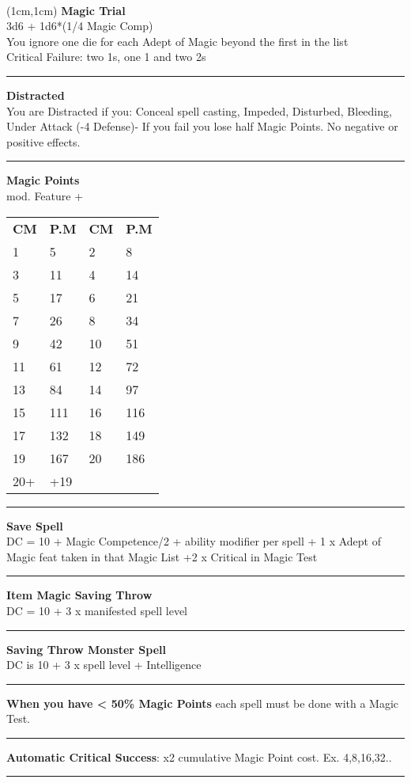 \documentclass[a4paper,12 pt,openany]{book}
\newcommand{\linex}{\rule{\textwidth}{0.4pt}}
\begin{document}
~\newpage

\begin{textblock*}{5cm}(1cm,1cm) %
\textbf{Magic Trial}\\
3d6 + 1d6*(1/4 Magic Comp)\\
You ignore one die for each Adept of Magic beyond the first in the list\\
Critical Failure: two 1s, one 1 and two 2s\\


\linex

\textbf{Distracted}\\
You are Distracted if you: Conceal spell casting, Impeded, Disturbed, Bleeding, Under Attack (-4 Defense)-
If you fail you lose half Magic Points. No negative or positive effects.\\

\linex

\textbf{Magic Points}\\
mod. Feature + \\

\begin{tabular}{ll|ll}
\textbf{CM} & \textbf{P.M}& \textbf{CM} & \textbf{P.M}\\
1&5 &2&8 \\
3&11&4&14\\
5&17&6&21\\
7&26&8&34\\
9&42&10&51\\
11&61&12&72\\
13&84&14&97\\
15&111&16&116\\
17&132&18&149\\
19&167&20&186\\
20+&+19&&\\
\end{tabular}

\linex

\textbf{Save Spell}\\
DC = 10 + Magic Competence/2 + ability modifier per spell + 1 x Adept of Magic feat taken in that Magic List +2 x Critical in Magic Test

\linex

\textbf{Item Magic Saving Throw}\\
DC = 10 + 3 x manifested spell level

\linex

\textbf{Saving Throw Monster Spell}\\
DC is 10 + 3 x spell level + Intelligence

\linex

\textbf{When you have < 50\% Magic Points} each spell must be done with a Magic Test.

\linex

\textbf{Automatic Critical Success}: x2 cumulative Magic Point cost. Ex. 4,8,16,32..

\linex

\end{textblock*}
\end{document}
